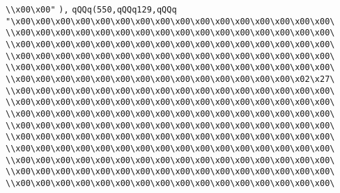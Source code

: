 \verb|\\x00\x00"|\newline
\verb|),|\newline
\verb|qQQq(550,qQQq129,qQQq|\newline
\verb|"\x00\x00\x00\x00\x00\x00\x00\x00\x00\x00\x00\x00\x00\x00\x00\x00\|\newline
\verb|\\x00\x00\x00\x00\x00\x00\x00\x00\x00\x00\x00\x00\x00\x00\x00\x00\|\newline
\verb|\\x00\x00\x00\x00\x00\x00\x00\x00\x00\x00\x00\x00\x00\x00\x00\x00\|\newline
\verb|\\x00\x00\x00\x00\x00\x00\x00\x00\x00\x00\x00\x00\x00\x00\x00\x00\|\newline
\verb|\\x00\x00\x00\x00\x00\x00\x00\x00\x00\x00\x00\x00\x00\x00\x00\x00\|\newline
\verb|\\x00\x00\x00\x00\x00\x00\x00\x00\x00\x00\x00\x00\x00\x00\x02\x27\|\newline
\verb|\\x00\x00\x00\x00\x00\x00\x00\x00\x00\x00\x00\x00\x00\x00\x00\x00\|\newline
\verb|\\x00\x00\x00\x00\x00\x00\x00\x00\x00\x00\x00\x00\x00\x00\x00\x00\|\newline
\verb|\\x00\x00\x00\x00\x00\x00\x00\x00\x00\x00\x00\x00\x00\x00\x00\x00\|\newline
\verb|\\x00\x00\x00\x00\x00\x00\x00\x00\x00\x00\x00\x00\x00\x00\x00\x00\|\newline
\verb|\\x00\x00\x00\x00\x00\x00\x00\x00\x00\x00\x00\x00\x00\x00\x00\x00\|\newline
\verb|\\x00\x00\x00\x00\x00\x00\x00\x00\x00\x00\x00\x00\x00\x00\x00\x00\|\newline
\verb|\\x00\x00\x00\x00\x00\x00\x00\x00\x00\x00\x00\x00\x00\x00\x00\x00\|\newline
\verb|\\x00\x00\x00\x00\x00\x00\x00\x00\x00\x00\x00\x00\x00\x00\x00\x00\|\newline
\verb|\\x00\x00\x00\x00\x00\x00\x00\x00\x00\x00\x00\x00\x00\x00\x00\x00\|\newline
